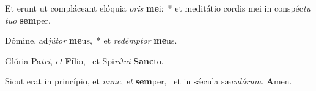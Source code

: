 \item Et erunt ut compláceant elóquia \textit{o}\textit{ris} \textbf{me}i:~* et meditátio cordis mei in conspéc\textit{tu} \textit{tu}\textit{o} \textbf{sem}per.
\item Dómine, ad\textit{jú}\textit{tor} \textbf{me}us,~* et \textit{red}\textit{émp}\textit{tor} \textbf{me}us.
\item Glória Pa\textit{tri}, \textit{et} \textbf{Fí}lio,~\psstar{} et Spi\textit{rí}\textit{tu}\textit{i} \textbf{Sanc}to.
\item Sicut erat in princípio, et \textit{nunc}, \textit{et} \textbf{sem}per,~\psstar{} et in sǽcula sæ\textit{cu}\textit{ló}\textit{rum}. \textbf{A}men.

